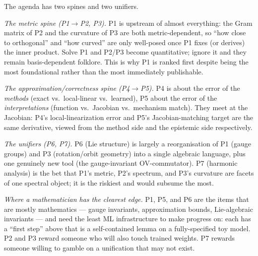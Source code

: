 The agenda has two spines and two unifiers.

\emph{The metric spine (P1$\to$P2, P3).} P1 is upstream of almost everything: the Gram matrix of
P2 and the curvature of P3 are both metric-dependent, so ``how close to orthogonal'' and ``how
curved'' are only well-posed once P1 fixes (or derives) the inner product. Solve P1 and P2/P3
become quantitative; ignore it and they remain basis-dependent folklore. This is why P1 is ranked
first despite being the most foundational rather than the most immediately publishable.

\emph{The approximation/correctness spine (P4$\to$P5).} P4 is about the error of the
\emph{methods} (exact vs.\ local-linear vs.\ learned), P5 about the error of the
\emph{interpretations} (function vs.\ Jacobian vs.\ mechanism match). They meet at the Jacobian:
P4's local-linearization error and P5's Jacobian-matching target are the same derivative, viewed
from the method side and the epistemic side respectively.

\emph{The unifiers (P6, P7).} P6 (Lie structure) is largely a reorganisation of P1 (gauge groups)
and P3 (rotation/orbit geometry) into a single algebraic language, plus one genuinely new tool
(the gauge-invariant OV-commutator). P7 (harmonic analysis) is the bet that P1's metric, P2's
spectrum, and P3's curvature are facets of one spectral object; it is the riskiest and would
subsume the most.

\emph{Where a mathematician has the clearest edge.} P1, P5, and P6 are the items that are mostly
mathematics --- gauge invariants, approximation bounds, Lie-algebraic invariants --- and need the
least ML infrastructure to make progress on: each has a ``first step'' above that is a self-contained
lemma on a fully-specified toy model. P2 and P3 reward someone who will also touch trained weights.
P7 rewards someone willing to gamble on a unification that may not exist.

\printbibliography

